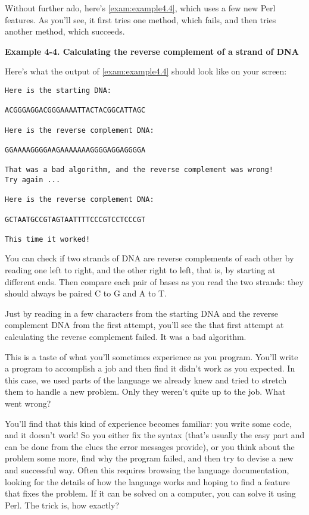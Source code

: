 Without further ado, here's \autoref{exam:example4.4}, which uses a few new Perl features. As you'll see, it first tries one method, which fails, and then tries another method, which succeeds. 

\textbf{Example 4-4. Calculating the reverse complement of a strand of DNA}



Here's what the output of \autoref{exam:example4.4} should look like on your screen:

\begin{lstlisting}
Here is the starting DNA:

ACGGGAGGACGGGAAAATTACTACGGCATTAGC

Here is the reverse complement DNA:

GGAAAAGGGGAAGAAAAAAAGGGGAGGAGGGGA

That was a bad algorithm, and the reverse complement was wrong!
Try again ...

Here is the reverse complement DNA:

GCTAATGCCGTAGTAATTTTCCCGTCCTCCCGT

This time it worked!
\end{lstlisting}

You can check if two strands of DNA are reverse complements of each other by reading one left to right, and the other right to left, that is, by starting at different ends. Then compare each pair of bases as you read the two strands: they should always be paired C to G and A to T.

Just by reading in a few characters from the starting DNA and the reverse complement DNA from the first attempt, you'll see the that first attempt at calculating the reverse complement failed. It was a bad algorithm.

This is a taste of what you'll sometimes experience as you program. You'll write a program to accomplish a job and then find it didn't work as you expected. In this case, we used parts of the language we already knew and tried to stretch them to handle a new problem. Only they weren't quite up to the job. What went wrong?

You'll find that this kind of experience becomes familiar: you write some code, and it doesn't work! So you either fix the syntax (that's usually the easy part and can be done from the clues the error messages provide), or you think about the problem some more, find why the program failed, and then try to devise a new and successful way. Often this requires browsing the language documentation, looking for the details of how the language works and hoping to find a feature that fixes the problem. If it can be solved on a computer, you can solve it using Perl. The trick is, how exactly? 

